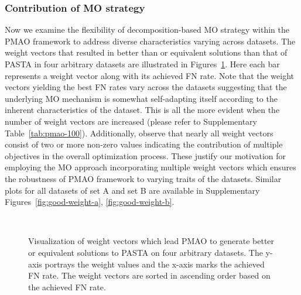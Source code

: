 \subsubsection{Contribution of MO strategy}

Now we examine the flexibility of decomposition-based MO strategy within the PMAO framework to address diverse characteristics varying across datasets. The weight vectors that resulted in better than or equivalent solutions than that of PASTA in four arbitrary datasets are illustrated in Figures~\ref{fig:good-weight}. Here each bar represents a weight vector along with its achieved FN rate.  Note that the weight vectors yielding the best FN rates vary across the datasets suggesting that the underlying MO mechanism is somewhat self-adapting itself according to the inherent characteristics of the dataset. This is all the more evident when the number of weight vectors are increased (please refer to Supplementary Table~\ref{tab:pmao-100}). Additionally, observe that nearly all weight vectors consist of two or more non-zero values indicating the contribution of multiple objectives in the overall optimization process. These justify our motivation for employing the MO approach incorporating multiple weight vectors which ensures the robustness of PMAO framework to varying traits of the datasets. Similar plots for all datasets of set A and set B are available in Supplementary Figures~\ref{fig:good-weight-a}, \ref{fig:good-weight-b}.

\begin{figure}[!htbp]%
	\begin{adjustwidth}{-0.6cm}{}
		\centering
		\\
	\end{adjustwidth}
	\caption{Visualization of weight vectors which lead PMAO to generate better or equivalent solutions to PASTA on four arbitrary datasets. The y-axis portrays the weight values and the x-axis marks the achieved FN rate. The weight vectors are sorted in ascending order based on the achieved FN rate. }
	\label{fig:good-weight}
\end{figure}


